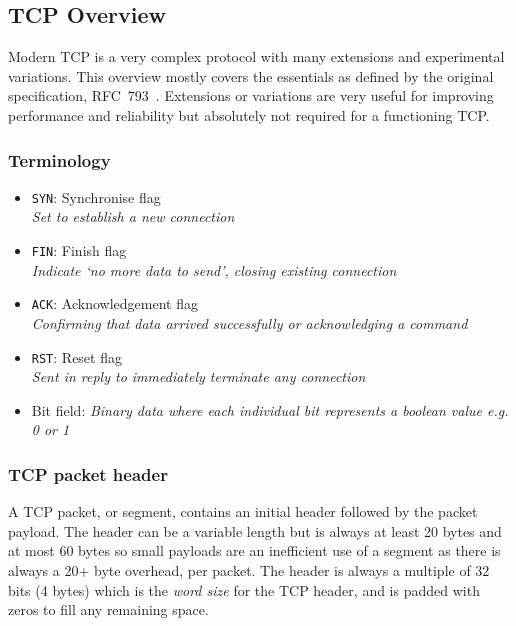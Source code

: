 
\subsection{TCP Overview}
    Modern TCP is a very complex protocol with many extensions and experimental variations. This overview mostly covers the essentials as defined by the original specification, RFC~793~\cite{rfc793}. Extensions or variations are very useful for improving performance and reliability but absolutely not required for a functioning TCP. %

    \subsubsection{Terminology}
        \begin{itemize}
            \item \texttt{SYN}: Synchronise flag\\
                \textit{Set to establish a new connection}
            \item \texttt{FIN}: Finish flag\\
                \textit{Indicate `no more data to send', closing existing connection}
            \item \texttt{ACK}: Acknowledgement flag\\
                \textit{Confirming that data arrived successfully or acknowledging a command}
            \item \texttt{RST}: Reset flag\\
                \textit{Sent in reply to immediately terminate any connection}
            \item Bit field: \textit{Binary data where each individual bit represents a boolean value e.g. 0 or 1}
        \end{itemize}

    \subsubsection{TCP packet header}
        A TCP packet, or segment, contains an initial header followed by the packet payload. The header can be a variable length but is always at least 20 bytes and at most 60 bytes so small payloads are an inefficient use of a segment as there is always a 20+ byte overhead, per packet. The header is always a multiple of 32 bits (4 bytes) which is the \textit{word size} for the TCP header, and is padded with zeros to fill any remaining space.

